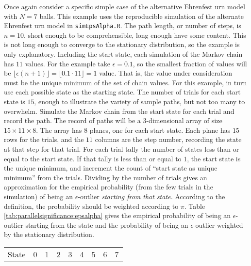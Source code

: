 \documentclass[12pt]{article}
\begin{document}
\begin{example}
    Once again consider a specific simple case of the alternative
    Ehrenfest urn model with \( N = 7 \) balls.%
    This example uses the reproducible simulation of the alternate
    Ehrenfest urn model in \texttt{simEpsAlpha.R}.  The path length, or
    number of steps, is \( n = 10 \), short enough to be comprehensible,
    long enough have some content.  This is not long enough to converge
    to the stationary distribution, so the example is only explanatory.
    Including the start state, each simulation of the Markov chain has \(
    11 \) values.  For the example take \( \epsilon = 0.1 \), so the
    smallest fraction of values will be \( \lfloor \epsilon (n+1)
    \rfloor = \lfloor 0.1 \cdot 11 \rfloor = 1 \) value.  That is, the
    value under consideration must be the unique minimum of the set of
    chain values.  For this example, in turn use each possible state as
    the starting state.  The number of trials for each start state is \(
    15 \), enough to illustrate the variety of sample paths, but not too
    many to overwhelm.  Simulate the Markov chain from the start state
    for each trial and record the path.  The record of paths will be a \(
    3 \)-dimensional array of size \( 15 \times 11 \times 8 \).  The
    array has \( 8 \) planes, one for each start state.  Each plane has \(
    15 \) rows for the trials, and the \( 11 \) columns are the step
    number, recording the state at that step for that trial.  For each
    trial tally the number of states less than or equal to the start
    state. If that tally is less than or equal to \( 1 \), the start
    state is the unique minimum, and increment the count of ``start
    state as unique minimum'' from the trials.  Dividing by the number
    of trials gives an approximation for the empirical probability (from
    the few trials in the simulation) of being an \( \epsilon \)-outlier
    \emph{starting from that state.} According to the definition, the
    probability should be weighted according to \( \pi \).  Table~%
    \ref{tab:parallelsignificance:epsalpha} gives the empirical
    probability of being an \( \epsilon \)-outlier starting from the
    state and the probability of being an \( \epsilon \)-outlier
    weighted by the stationary distribution.
    \begin{table}
        \centering
        \begin{tabular}{l|cccccccc}
            State                                   & 0     & 1     & 2     & 3     & 4      & 5     & 6     & 7     \\ 

\end{tabular}
\end{table}
\end{example}
\end{document}
